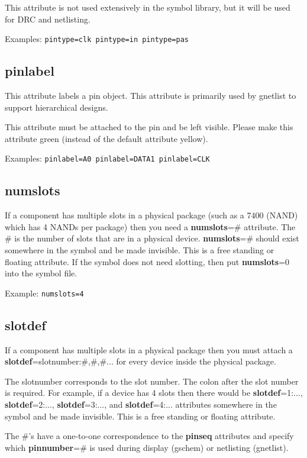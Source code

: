 \documentclass{article}
\begin{document}
\vspace{.125in}

This attribute is not used extensively in the symbol library, but it
will be used for DRC and netlisting.

Examples: \texttt{pintype=clk pintype=in pintype=pas}   


\subsection{\bf pinlabel\label{pinlabel}}
This attribute labels a pin object.  This attribute is primarily used 
by gnetlist to support hierarchical designs.

This attribute must be attached to the pin and be left visible.  Please
make this attribute green (instead of the default attribute yellow).

Examples: \texttt{pinlabel=A0 pinlabel=DATA1 pinlabel=CLK}


\subsection{\bf numslots\label{numslots}}
If a component has multiple slots in a physical package (such as a 7400
(NAND) which has 4 NANDs per package) then you need a {\bf numslots}=\#
attribute.  The \# is the number of slots that are in a physical device.
{\bf numslots}=\# should exist somewhere in the symbol and be made
invisible.  This is a free standing or floating attribute.  If the symbol
does not need slotting, then put {\bf numslots}=0 into the symbol file.

Example: \texttt{numslots=4}


\subsection{\bf slotdef\label{slotdef}}
If a component has multiple slots in a physical package then you must 
attach a {\bf slotdef}=slotnumber:\#,\#,\#... for every device inside
the physical package.

The slotnumber corresponds to the slot number.  The colon after the
slot number is required.  For example, if a device has 4 slots then there
would be {\bf slotdef}=1:..., {\bf slotdef}=2:..., {\bf slotdef}=3:...,
and {\bf slotdef}=4:...  attributes somewhere in the symbol and be
made invisible.  This is a free standing or floating attribute.

The \#'s have a one-to-one correspondence to the {\bf pinseq} attributes
and specify which {\bf pinnumber}=\# is used during display (gschem)
or netlisting (gnetlist).
\end{document}
